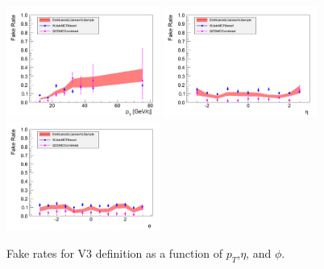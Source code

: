 \begin{figure}[!htbp]
\begin{center}
\includegraphics[width=0.45\textwidth]{figures/ElectronFakeRate_DenominatorV3_ptThreshold30_Pt.pdf}
\includegraphics[width=0.45\textwidth]{figures/ElectronFakeRate_DenominatorV3_ptThreshold30_Eta.pdf}
\includegraphics[width=0.45\textwidth]{figures/ElectronFakeRate_DenominatorV3_ptThreshold30_Phi.pdf}
\caption{Fake rates for V3 definition as a function of $p_T$,$\eta$, and $\phi$.}
\label{fig:ele_fr_V3_jet30}
\end{center}
\end{figure}

